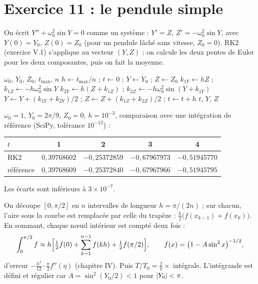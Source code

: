 \section{Exercice 11 : le pendule simple}

\Pourquoi On écrit $Y'' + \omega_0^2\sin Y = 0$ comme un système :
$Y' = Z$, $Z' = -\omega_0^2\sin Y$, avec $Y(0) = Y_0$, $Z(0) = Z_0$ (pour un
pendule lâché sans vitesse, $Z_0 = 0$). RK2 (exercice V.1) s'applique au vecteur
$(Y, Z)$ : on calcule les deux pentes de Euler pour les deux composantes,
puis on fait la moyenne.

\begin{algo}
  \Require $\omega_0$, $Y_0$, $Z_0$, $t_{\max}$, $n$
  \State $h \leftarrow t_{\max}/n$ ; $t \leftarrow 0$ ; $Y \leftarrow Y_0$ ; $Z \leftarrow Z_0$
    \State $k_{1Y} \leftarrow hZ$ ; $k_{1Z} \leftarrow -h\omega_0^2\sin Y$
    \State $k_{2Y} \leftarrow h(Z + k_{1Z})$ ; $k_{2Z} \leftarrow -h\omega_0^2\sin(Y + k_{1Y})$
    \State $Y \leftarrow Y + (k_{1Y} + k_{2Y})/2$ ; $Z \leftarrow Z + (k_{1Z} + k_{2Z})/2$ ; $t \leftarrow t + h$
    \Print $t$, $Y$, $Z$
  \EndFor
\end{algo}


\Verif $\omega_0 = 1$, $Y_0 = 2\pi/9$, $Z_0 = 0$, $h = 10^{-3}$, comparaison
avec une intégration de référence (SciPy, tolérance $10^{-12}$) :
\begin{center}
\begin{tabular}{lcccc}
  \toprule
  $t$ & 1 & 2 & 3 & 4\\ \midrule
  RK2 & $0{,}39768602$ & $-0{,}25372859$ & $-0{,}67967973$ & $-0{,}51945770$\\
  référence & $0{,}39768609$ & $-0{,}25372840$ & $-0{,}67967966$ & $-0{,}51945795$\\
  \bottomrule
\end{tabular}
\end{center}
Les écarts sont inférieurs à $3\times 10^{-7}$.

\Pourquoi On découpe $[0, \pi/2]$ en $n$ intervalles de longueur
$h = \pi/(2n)$ ; sur chacun, l'aire sous la courbe est remplacée par celle du
trapèze : $\frac h2\bigl(f(x_{k-1}) + f(x_k)\bigr)$. En sommant, chaque nœud
intérieur est compté deux fois :
\[
  \int_0^{\pi/2} f \approx h\Bigl[\tfrac12f(0) + \sum_{k=1}^{n-1}f(kh) + \tfrac12f(\pi/2)\Bigr],
  \qquad f(x) = \bigl(1 - A\sin^2x\bigr)^{-1/2},
\]
d'erreur $-\frac{h^2}{12}\cdot\frac\pi2f''(\eta)$ (chapitre IV). Puis
$T/T_0 = \frac2\pi\times$ intégrale. L'intégrande est défini et régulier car
$A = \sin^2(Y_0/2) < 1$ pour $\left|Y_0\right| < \pi$.

